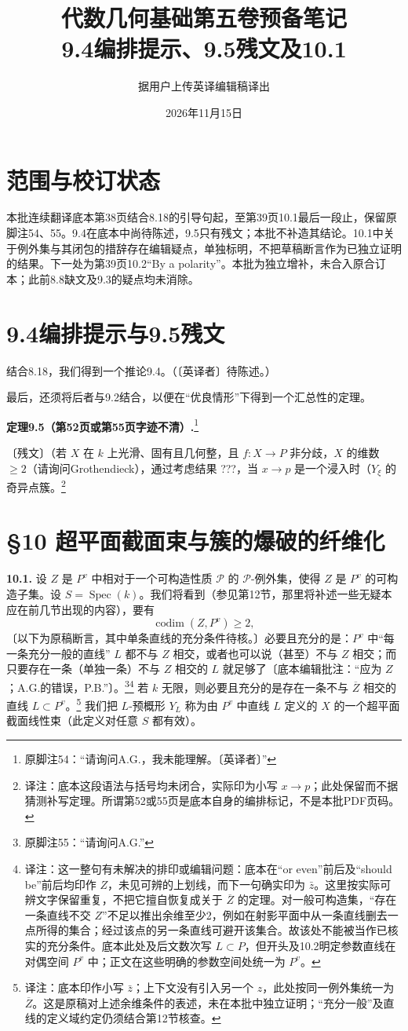 \documentclass[openany]{ctexbook}
\title{代数几何基础第五卷预备笔记\\9.4编排提示、9.5残文及10.1}
\author{据用户上传英译编辑稿译出}
\date{2026年11月15日}
\newcommand{\note}[1]{\footnote{译注：#1}}
\begin{document}
\maketitle
\chapter*{范围与校订状态}
本批连续翻译底本第38页结合8.18的引导句起，至第39页10.1最后一段止，保留原脚注54、55。9.4在底本中尚待陈述，9.5只有残文；本批不补造其结论。10.1中关于例外集与其闭包的措辞存在编辑疑点，单独标明，不把草稿断言作为已独立证明的结果。下一处为第39页10.2“By a polarity”。本批为独立增补，未合入原合订本；此前8.8缺文及9.3的疑点均未消除。
\chapter*{9.4编排提示与9.5残文}
结合8.18，我们得到一个推论9.4。（〔英译者〕待陈述。）

最后，还须将后者与9.2结合，以便在“优良情形”下得到一个汇总性的定理。

\noindent\textbf{定理9.5（第52页或第55页字迹不清）.}\footnote{原脚注54：“请询问A.G.，我未能理解。〔英译者〕”}

〔残文〕（若 $X$ 在 $k$ 上光滑、固有且几何整，且 $f:X\to P$ 非分歧，$X$ 的维数 $\ge2$（请询问Grothendieck），通过考虑结果 ???，当 $x\to p$ 是一个浸入时（$Y_\xi$ 的奇异点簇。\note{底本这段语法与括号均未闭合，实际印为小写 $x\to p$；此处保留而不据猜测补写定理。所谓第52或55页是底本自身的编排标记，不是本批PDF页码。}
\chapter*{§10 超平面截面束与簇的爆破的纤维化}
\noindent\textbf{10.1.}
设 $Z$ 是 $P^v$ 中相对于一个可构造性质 $\mathcal P$ 的 $\mathcal P$-例外集，使得 $Z$ 是 $P^v$ 的可构造子集。设 $S=\operatorname{Spec}(k)$。我们将看到（参见第12节，那里将补述一些无疑本应在前几节出现的内容），要有
\[
\operatorname{codim}(Z,P^v)\ge2,
\]
〔以下为原稿断言，其中单条直线的充分条件待核。〕必要且充分的是：$P^v$ 中“每一条充分一般的直线” $L$ 都不与 $Z$ 相交，或者也可以说（甚至）不与 $Z$ 相交；而只要存在一条（单独一条）不与 $Z$ 相交的 $L$ 就足够了〔底本编辑批注：“应为 $Z$；A.G.的错误，P.B.”〕。\footnote{原脚注55：“请询问A.G.”}\note{这一整句有未解决的排印或编辑问题：底本在“or even”前后及“should be”前后均印作 $Z$，未见可辨的上划线，而下一句确实印为 $\bar z$。这里按实际可辨文字保留重复，不把它擅自恢复成关于 $\overline Z$ 的定理。对一般可构造集，“存在一条直线不交 $Z$”不足以推出余维至少2，例如在射影平面中从一条直线删去一点所得的集合；经过该点的另一条直线可避开该集合。故该处不能被当作已核实的充分条件。底本此处及后文数次写 $L\subset P$，但开头及10.2明定参数直线在对偶空间 $P^v$ 中；正文在这些明确的参数空间处统一为 $P^v$。}
若 $k$ 无限，则必要且充分的是存在一条不与 $\overline Z$ 相交的直线 $L\subset P^v$。\note{底本印作小写 $\bar z$；上下文没有引入另一个 $z$，此处按同一例外集统一为 $\overline Z$。这是原稿对上述余维条件的表述，未在本批中独立证明；“充分一般”及直线的定义域约定仍须结合第12节核查。}
我们把 $L$-预概形 $Y_L$ 称为由 $P^v$ 中直线 $L$ 定义的 $X$ 的一个超平面截面线性束（此定义对任意 $S$ 都有效）。
\end{document}

